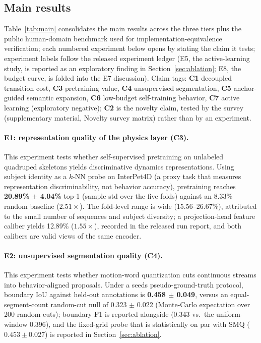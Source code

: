 \subsection{Main results}\label{sec:main-results}

Table~\ref{tab:main} consolidates the main results across the three tiers plus the public human-domain benchmark used for implementation-equivalence verification; each numbered experiment below opens by stating the claim it tests; experiment labels follow the released experiment ledger (E5, the active-learning study, is reported as an exploratory finding in Section~\ref{sec:ablation}; E8, the budget curve, is folded into the E7 discussion). Claim tags: \textbf{C1} decoupled transition cost, \textbf{C3} pretraining value, \textbf{C4} unsupervised segmentation, \textbf{C5} anchor-guided semantic expansion, \textbf{C6} low-budget self-training behavior, \textbf{C7} active learning (exploratory negative); \textbf{C2} is the novelty claim, tested by the survey (supplementary material, Novelty survey matrix) rather than by an experiment.

\paragraph{E1: representation quality of the physics layer (C3).}
This experiment tests whether self-supervised pretraining on unlabeled quadruped skeletons yields discriminative dynamics representations. Using subject identity as a $k$-NN probe on InterPet4D (a proxy task that measures representation discriminability, not behavior accuracy), pretraining reaches \textbf{20.89\% $\pm$ 4.04\%} top-1 (sample std over the five folds) against an 8.33\% random baseline ($2.51\times$). The fold-level range is wide (15.56--26.67\%), attributed to the small number of sequences and subject diversity; a projection-head feature caliber yields 12.89\% ($1.55\times$), recorded in the released run report, and both calibers are valid views of the same encoder.

\paragraph{E2: unsupervised segmentation quality (C4).}
This experiment tests whether motion-word quantization cuts continuous streams into behavior-aligned proposals. Under a seeds pseudo-ground-truth protocol, boundary IoU against held-out annotations is \textbf{0.458 $\pm$ 0.049}, versus an equal-segment-count random-cut null of 0.323 $\pm$ 0.022 (Monte-Carlo expectation over 200 random cuts); boundary F1 is reported alongside (0.343 vs.\ the uniform-window 0.396), and the fixed-grid probe that is statistically on par with SMQ ($0.453 \pm 0.027$) is reported in Section~\ref{sec:ablation}.


